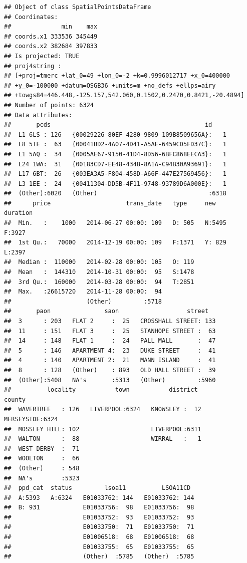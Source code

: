\documentclass[]{book}
\begin{document}
\begin{verbatim}
## Object of class SpatialPointsDataFrame
## Coordinates:
##              min    max
## coords.x1 333536 345449
## coords.x2 382684 397833
## Is projected: TRUE 
## proj4string :
## [+proj=tmerc +lat_0=49 +lon_0=-2 +k=0.9996012717 +x_0=400000
## +y_0=-100000 +datum=OSGB36 +units=m +no_defs +ellps=airy
## +towgs84=446.448,-125.157,542.060,0.1502,0.2470,0.8421,-20.4894]
## Number of points: 6324
## Data attributes:
##       pcds                                           id      
##  L1 6LS : 126   {00029226-80EF-4280-9809-109B8509656A}:   1  
##  L8 5TE :  63   {00041BD2-4A07-4D41-A5AE-6459CD5FD37C}:   1  
##  L1 5AQ :  34   {0005AE67-9150-41D4-8D56-6BFC868EECA3}:   1  
##  L24 1WA:  31   {00183CD7-EE48-434B-8A1A-C94B30A93691}:   1  
##  L17 6BT:  26   {003EA3A5-F804-458D-A66F-447E27569456}:   1  
##  L3 1EE :  24   {00411304-DD5B-4F11-9748-93789D6A000E}:   1  
##  (Other):6020   (Other)                               :6318  
##      price                     trans_date   type     new      duration
##  Min.   :    1000   2014-06-27 00:00: 109   D: 505   N:5495   F:3927  
##  1st Qu.:   70000   2014-12-19 00:00: 109   F:1371   Y: 829   L:2397  
##  Median :  110000   2014-02-28 00:00: 105   O: 119                    
##  Mean   :  144310   2014-10-31 00:00:  95   S:1478                    
##  3rd Qu.:  160000   2014-03-28 00:00:  94   T:2851                    
##  Max.   :26615720   2014-11-28 00:00:  94                             
##                     (Other)         :5718                             
##       paon               saon                   street    
##  3      : 203   FLAT 2     :  25   CROSSHALL STREET: 133  
##  11     : 151   FLAT 3     :  25   STANHOPE STREET :  63  
##  14     : 148   FLAT 1     :  24   PALL MALL       :  47  
##  5      : 146   APARTMENT 4:  23   DUKE STREET     :  41  
##  4      : 140   APARTMENT 2:  21   MANN ISLAND     :  41  
##  8      : 128   (Other)    : 893   OLD HALL STREET :  39  
##  (Other):5408   NA's       :5313   (Other)         :5960  
##          locality           town           district           county    
##  WAVERTREE   : 126   LIVERPOOL:6324   KNOWSLEY :  12   MERSEYSIDE:6324  
##  MOSSLEY HILL: 102                    LIVERPOOL:6311                    
##  WALTON      :  88                    WIRRAL   :   1                    
##  WEST DERBY  :  71                                                      
##  WOOLTON     :  66                                                      
##  (Other)     : 548                                                      
##  NA's        :5323                                                      
##  ppd_cat  status         lsoa11          LSOA11CD   
##  A:5393   A:6324   E01033762: 144   E01033762: 144  
##  B: 931            E01033756:  98   E01033756:  98  
##                    E01033752:  93   E01033752:  93  
##                    E01033750:  71   E01033750:  71  
##                    E01006518:  68   E01006518:  68  
##                    E01033755:  65   E01033755:  65  
##                    (Other)  :5785   (Other)  :5785
\end{verbatim}
\end{document}

